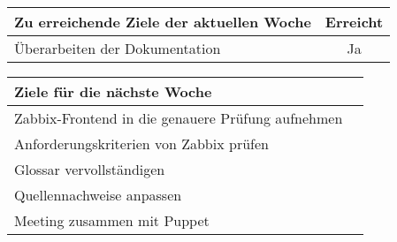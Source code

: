 \begin{tabularx}{\textwidth}{Xc}
    \arrayrulecolor{OliveGreen}
    \toprule
    {\bfseries Zu erreichende Ziele der aktuellen Woche} & {\bfseries Erreicht} \\
    \midrule[2pt]
    Überarbeiten der Dokumentation                          &Ja              \\
    \bottomrule[2pt]
\end{tabularx}
%
\vspace{1cm}
%
\begin{tabularx}{\textwidth}{Xc}
    \arrayrulecolor{OliveGreen}
    \toprule
    {\bfseries Ziele für die nächste Woche}        &                         \\
    \midrule[2pt]
    Zabbix-Frontend in die genauere Prüfung aufnehmen &                      \\
    \rowcolor{OliveGreen!15}
    Anforderungskriterien von Zabbix prüfen        &                         \\
    \rowcolor{White}
    Glossar vervollständigen                       &                         \\
    \rowcolor{OliveGreen!15}
    Quellennachweise anpassen                      &                         \\
    \rowcolor{White}
    Meeting zusammen mit Puppet                    &                         \\
\end{tabularx}
